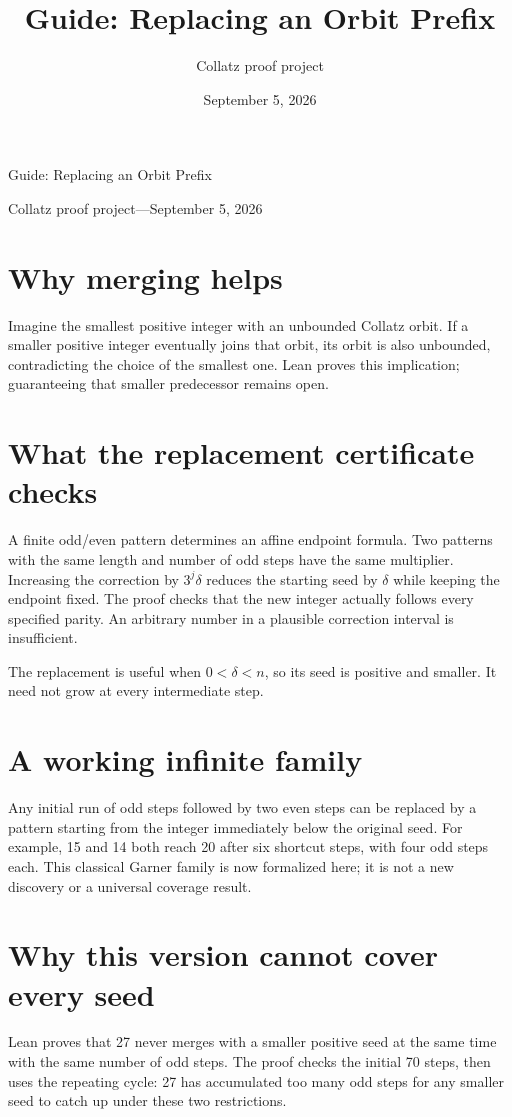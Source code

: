 \documentclass[10pt]{article}
\title{Guide: Replacing an Orbit Prefix}
\author{Collatz proof project}
\date{September 5, 2026}
\begin{document}
\begin{center}
{\LARGE Guide: Replacing an Orbit Prefix}\par\medskip
Collatz proof project\quad---\quad September 5, 2026
\end{center}
\raggedright
\section*{Why merging helps}
Imagine the smallest positive integer with an unbounded Collatz orbit.
If a smaller positive integer eventually joins that orbit, its orbit is
also unbounded, contradicting the choice of the smallest one. Lean proves this implication; guaranteeing that smaller predecessor
remains open.

\section*{What the replacement certificate checks}
A finite odd/even pattern determines an affine endpoint formula. Two
patterns with the same length and number of odd steps have the same
multiplier. Increasing the correction by $3^j\delta$ reduces the starting
seed by $\delta$ while keeping the endpoint fixed. The proof checks that
the new integer actually follows every specified parity. An arbitrary
number in a plausible correction interval is insufficient.

The replacement is useful when $0<\delta<n$, so its seed is positive
and smaller. It need not grow at every intermediate step.

\section*{A working infinite family}
Any initial run of odd steps followed by two even steps can be replaced
by a pattern starting from the integer immediately below the original
seed. For example, 15 and 14 both reach 20 after six shortcut steps, with four
odd steps each. This classical Garner family is now formalized here;
it is not a new discovery or a universal coverage result.

\section*{Why this version cannot cover every seed}
Lean proves that 27 never merges with a smaller positive seed at the
same time with the same number of odd steps. The proof checks the initial 70 steps, then uses the repeating cycle:
27 has accumulated too many odd steps for any smaller seed to catch up
under these two restrictions.
\end{document}
